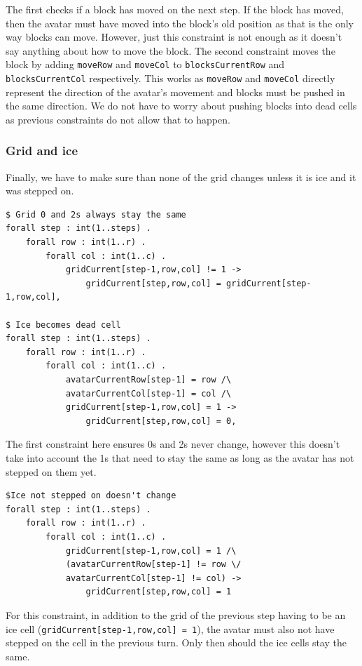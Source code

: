 \documentclass{article}
\begin{document}
The first checks if a block has moved on the next step. If the block has moved, then the avatar must have moved into the block's old position as that is the only way blocks can move. However, just this constraint is not enough as it doesn't say anything about how to move the block. The second constraint moves the block by adding \texttt{moveRow} and \texttt{moveCol} to \texttt{blocksCurrentRow} and \texttt{blocksCurrentCol} respectively. This works as \texttt{moveRow} and \texttt{moveCol} directly represent the direction of the avatar's movement and blocks must be pushed in the same direction. We do not have to worry about pushing blocks into dead cells as previous constraints do not allow that to happen. 


\subsubsection{Grid and ice}
Finally, we have to make sure than none of the grid changes unless it is ice and it was stepped on.

\begin{lstlisting}[caption={Constraints for grid cells}, captionpos=b]
$ Grid 0 and 2s always stay the same
forall step : int(1..steps) .
    forall row : int(1..r) .
        forall col : int(1..c) .
	    	gridCurrent[step-1,row,col] != 1 ->
	        	gridCurrent[step,row,col] = gridCurrent[step-1,row,col],

$ Ice becomes dead cell
forall step : int(1..steps) .
    forall row : int(1..r) .
        forall col : int(1..c) .
	    	avatarCurrentRow[step-1] = row /\
	    	avatarCurrentCol[step-1] = col /\
	    	gridCurrent[step-1,row,col] = 1 ->
	        	gridCurrent[step,row,col] = 0,
\end{lstlisting}
The first constraint here ensures 0s and 2s never change, however this doesn't take into account the 1s that need to stay the same as long as the avatar has not stepped on them yet. 
\begin{lstlisting}[caption={Additional constraint to prevent ice cells from changing}, captionpos=b]
$Ice not stepped on doesn't change
forall step : int(1..steps) .
    forall row : int(1..r) .
        forall col : int(1..c) .
	    	gridCurrent[step-1,row,col] = 1 /\
	    	(avatarCurrentRow[step-1] != row \/ 
	     	avatarCurrentCol[step-1] != col) ->
	        	gridCurrent[step,row,col] = 1

\end{lstlisting}
For this constraint, in addition to the grid of the previous step having to be an ice cell (\texttt{gridCurrent[step-1,row,col] = 1}), the avatar must also not have stepped on the cell in the previous turn. Only then should the ice cells stay the same.
\end{document}
